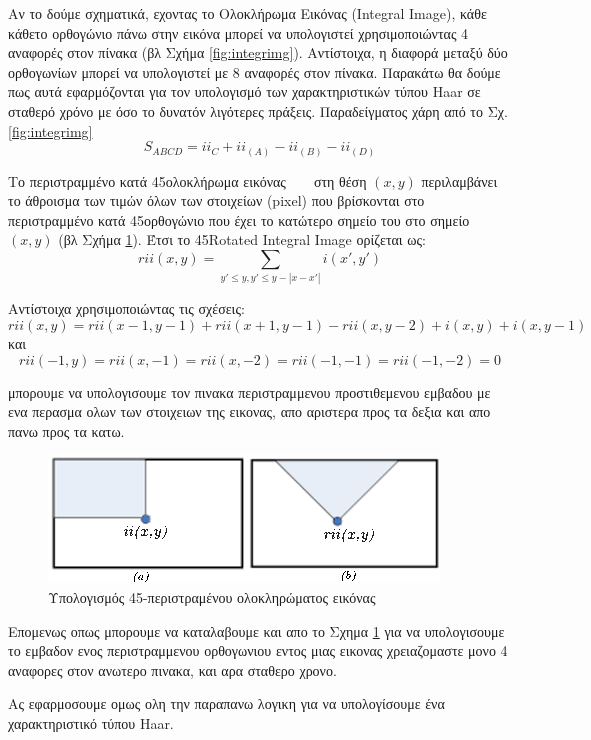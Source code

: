 Αν το δούμε σχηματικά, εχοντας το Ολοκλήρωμα Εικόνας (Integral Image), κάθε κάθετο ορθογώνιο
πάνω στην εικόνα μπορεί να υπολογιστεί χρησιμοποιώντας
4 αναφορές στον πίνακα (βλ Σχήμα \ref{fig:integrimg}). Αντίστοιχα, η διαφορά μεταξύ
δύο ορθογωνίων μπορεί να υπολογιστεί με 8 αναφορές στον πίνακα. Παρακάτω θα δούμε
πως αυτά εφαρμόζονται για τον υπολογισμό των χαρακτηριστικών τύπου Haar σε σταθερό
χρόνο με όσο το δυνατόν λιγότερες πράξεις. Παραδείγματος χάρη από το Σχ. \ref{fig:integrimg}
$$
S_{ABCD} = ii_{C} + ii_(A) - ii_(B) - ii_(D)
$$

Το περιστραμμένο κατά 45\degree ολοκλήρωμα  εικόνας ~\cite{Lienhart02anextended}
~\cite{Lienhart2003} στη θέση $(x,y)$ περιλαμβάνει
το άθροισμα των τιμών όλων των στοιχείων (pixel) που βρίσκονται στο περιστραμμένο
κατά 45\degree ορθογώνιο που έχει το κατώτερο σημείο του στο σημείο $(x,y)$
(βλ Σχήμα \ref{fig:rotintegrimg}). Έτσι το 45\degree Rotated Integral Image ορίζεται ως:
$$
rii(x,y) = \displaystyle\sum_{y'\leq y, y'\leq y-|x-x'|} i(x',y')
$$

Αντίστοιχα χρησιμοποιώντας τις σχέσεις:
$$
rii(x,y) = rii(x-1,y-1) + rii(x+1,y-1) - rii(x,y-2) + i(x,y) + i(x,y-1)
$$
και
$$
rii(-1,y)=rii(x,-1)=rii(x,-2)=rii(-1,-1)=rii(-1,-2)=0
$$

μπορουμε να υπολογισουμε τον πινακα περιστραμμενου προστιθεμενου εμβαδου με ενα
περασμα ολων των στοιχειων της εικονας, απο αριστερα προς τα δεξια και απο πανω
προς τα κατω.

\begin{figure}[htbp]
  \begin{center}
    \includegraphics[width=1.0\maxwidth]{../figures/rotintegrimg2.png}
    \caption{Υπολογισμός 45\degree-περιστραμένου ολοκληρώματος εικόνας\label{fig:rotintegrimg}}
   \end{center}
\end{figure}

Επομενως οπως μπορουμε να καταλαβουμε και απο το Σχημα \ref{fig:rotintegrimg}
 για να υπολογισουμε το εμβαδον ενος περιστραμμενου ορθογωνιου εντος μιας εικονας
 χρειαζομαστε μονο 4 αναφορες στον ανωτερο πινακα, και αρα σταθερο χρονο.

Ας εφαρμοσουμε ομως ολη την παραπανω λογικη για να υπολογίσουμε ένα χαρακτηριστικό
τύπου Haar.

